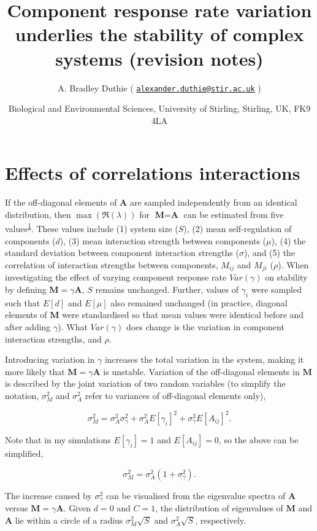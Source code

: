 \documentclass[]{article}
\title{Component response rate variation underlies the stability of complex
systems (revision notes)}
\author{A. Bradley Duthie (
\href{mailto:alexander.duthie@stir.ac.uk}{\nolinkurl{alexander.duthie@stir.ac.uk}}
)}
\date{Biological and Environmental Sciences, University of Stirling, Stirling,
UK, FK9 4LA}
\begin{document}
\maketitle

\section{Effects of correlations
interactions}\label{effects-of-correlations-interactions}

If the off-diagonal elements of \(\textbf{A}\) are sampled independently
from an identical distribution, then \(\max(\Re(\lambda))\) for
\(\textbf{M} = \textbf{A}\) can be estimated from five
values\textsuperscript{\protect\hyperlink{ref-Tang2014b}{1}}. These
values include (1) system size (\(S\)), (2) mean self-regulation of
components (\(d\)), (3) mean interaction strength between components
(\(\mu\)), (4) the standard deviation between component interaction
strengths (\(\sigma\)), and (5) the correlation of interaction strengths
between components, \(M_{ij}\) and \(M_{ji}\) (\(\rho\)). When
investigating the effect of varying component response rate
\(Var(\gamma)\) on stability by defining
\(\textbf{M} = \gamma\textbf{A}\), \(S\) remains unchanged. Further,
values of \(\gamma_{i}\) were sampled such that \(E[d]\) and \(E[\mu]\)
also remained unchanged (in practice, diagonal elements of
\(\textbf{M}\) were standardised so that mean values were identical
before and after adding \(\gamma\)). What \(Var(\gamma)\) does change is
the variation in component interaction strengths, and \(\rho\).

Introducing variation in \(\gamma\) increases the total variation in the
system, making it more likely that \(\textbf{M} = \gamma\textbf{A}\) is
unstable. Variation of the off-diagonal elements in \(\textbf{M}\) is
described by the joint variation of two random variables (to simplify
the notation, \(\sigma^{2}_{M}\) and \(\sigma^{2}_{A}\) refer to
variances of off-diagonal elements only),

\[\sigma^{2}_{M} = \sigma^{2}_{A}\sigma^{2}_{\gamma} + \sigma^{2}_{A}E[\gamma_{i}]^{2}+\sigma^{2}_{\gamma}E[A_{ij}]^{2}.\]

Note that in my simulations \(E[\gamma_{i}] = 1\) and \(E[A_{ij}] = 0\),
so the above can be simplified,

\[\sigma^{2}_{M} = \sigma^{2}_{A}(1 + \sigma^{2}_{\gamma}).\]

The increase caused by \(\sigma^{2}_\gamma\) can be visualised from the
eigenvalue spectra of \(\textbf{A}\) versus
\(\textbf{M} = \gamma\textbf{A}\). Given \(d = 0\) and \(C = 1\), the
distribution of eigenvalues of \(\textbf{M}\) and \(\textbf{A}\) lie
within a circle of a radius \(\sigma^{2}_{M}\sqrt{S}\) and
\(\sigma^{2}_{A}\sqrt{S}\), respectively.
\end{document}

